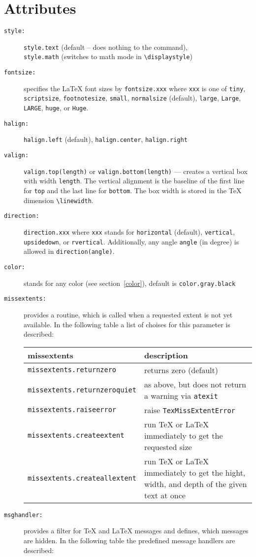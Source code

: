 \section{Attributes}
\begin{description}
\item[\texttt{style:}] \verb|style.text| (default -- does nothing to
the command),\\\verb|style.math| (switches to math mode in
\verb|\displaystyle|)
\item[\texttt{fontsize:}] specifies the \LaTeX{} font sizes by
\verb|fontsize.xxx| where \verb|xxx| is one of
\verb|tiny|,
\verb|scriptsize|,
\verb|footnotesize|,
\verb|small|,
\verb|normalsize| (default),
\verb|large|,
\verb|Large|,
\verb|LARGE|,
\verb|huge|, or
\verb|Huge|.
\item[\texttt{halign:}] \verb|halign.left| (default),
\verb|halign.center|, \verb|halign.right|
\item[\texttt{valign:}] \verb|valign.top(length)| or
\verb|valign.bottom(length)| --- creates a vertical box with width
\verb|length|. The vertical alignment is the baseline of the first line
for \verb|top| and the last line for \verb|bottom|. The box width is
stored in the \TeX{} dimension \verb|\linewidth|.
\item[\texttt{direction:}] \verb|direction.xxx| where \verb|xxx|
stands for \verb|horizontal| (default), \verb|vertical|,
\verb|upsidedown|, or \verb|rvertical|. Additionally, any angle
\verb|angle| (in degree) is allowed in \verb|direction(angle)|.
\item[\texttt{color:}] stands for any \PyX{} color (see
section~\ref{color}), default is \verb|color.gray.black|
\item[\texttt{missextents:}] provides a routine, which is called when a
requested extent is not yet available. In the following table a list
of choises for this parameter is described:

\begin{tabularx}{\linewidth}{l>{\raggedright\arraybackslash}X}
missextents&description\\
\hline
\texttt{missextents.returnzero}&returns zero (default)\\
\texttt{missextents.returnzeroquiet}&as above, but does not return a
warning via \texttt{atexit}\\
\texttt{missextents.raiseerror}&raise \texttt{TexMissExtentError}\\
\texttt{missextents.createextent}&run \TeX{} or \LaTeX{} immediately to
get the requested size\\
\texttt{missextents.createallextent}&run \TeX{} or \LaTeX{} immediately
to get the hight, width, and depth of the given text at once\\
\end{tabularx}
\item[\texttt{msghandler:}] provides a filter for \TeX{} and \LaTeX{}
messages and defines, which messages are hidden. In the following table
the predefined message handlers are described:


\end{description}
